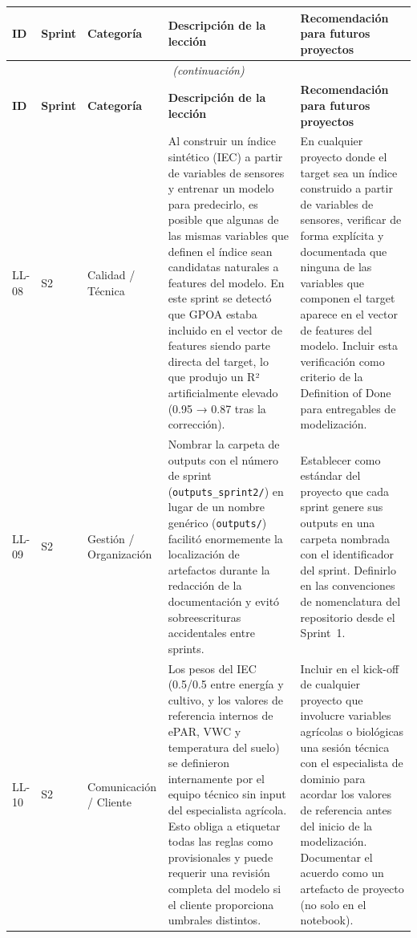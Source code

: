 \documentclass[12pt,a4paper]{article}
\begin{document}
\begin{longtable}{p{0.9cm} p{1.4cm} p{2.2cm} p{4.5cm} p{4.5cm}}
\toprule
\textbf{ID} & \textbf{Sprint} & \textbf{Categoría} & \textbf{Descripción de la lección} & \textbf{Recomendación para futuros proyectos} \\
\midrule
\endfirsthead
\multicolumn{5}{c}{\textit{(continuación)}} \\
\toprule
\textbf{ID} & \textbf{Sprint} & \textbf{Categoría} & \textbf{Descripción de la lección} & \textbf{Recomendación para futuros proyectos} \\
\midrule
\endhead
\bottomrule
\endlastfoot

LL-08
  & S2
  & Calidad / Técnica
  & Al construir un índice sintético (IEC) a partir de variables de sensores y entrenar un modelo para predecirlo, es posible que algunas de las mismas variables que definen el índice sean candidatas naturales a features del modelo. En este sprint se detectó que GPOA estaba incluido en el vector de features siendo parte directa del target, lo que produjo un R² artificialmente elevado (0.95 → 0.87 tras la corrección).
  & En cualquier proyecto donde el target sea un índice construido a partir de variables de sensores, verificar de forma explícita y documentada que ninguna de las variables que componen el target aparece en el vector de features del modelo. Incluir esta verificación como criterio de la Definition of Done para entregables de modelización. \\

LL-09
  & S2
  & Gestión / Organización
  & Nombrar la carpeta de outputs con el número de sprint (\texttt{outputs\_sprint2/}) en lugar de un nombre genérico (\texttt{outputs/}) facilitó enormemente la localización de artefactos durante la redacción de la documentación y evitó sobreescrituras accidentales entre sprints.
  & Establecer como estándar del proyecto que cada sprint genere sus outputs en una carpeta nombrada con el identificador del sprint. Definirlo en las convenciones de nomenclatura del repositorio desde el Sprint~1. \\

LL-10
  & S2
  & Comunicación / Cliente
  & Los pesos del IEC (0.5/0.5 entre energía y cultivo, y los valores de referencia internos de ePAR, VWC y temperatura del suelo) se definieron internamente por el equipo técnico sin input del especialista agrícola. Esto obliga a etiquetar todas las reglas como provisionales y puede requerir una revisión completa del modelo si el cliente proporciona umbrales distintos.
  & Incluir en el kick-off de cualquier proyecto que involucre variables agrícolas o biológicas una sesión técnica con el especialista de dominio para acordar los valores de referencia antes del inicio de la modelización. Documentar el acuerdo como un artefacto de proyecto (no solo en el notebook). \\


\end{longtable}
\end{document}
